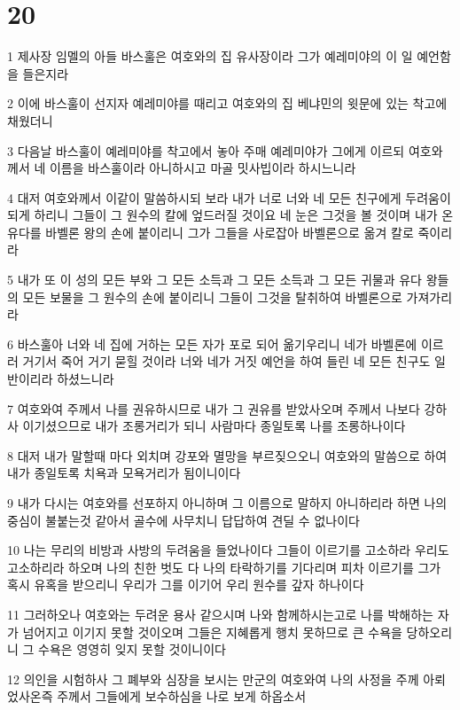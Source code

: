 \chapter{20}

\par 1 제사장 임멜의 아들 바스훌은 여호와의 집 유사장이라 그가 예레미야의 이 일 예언함을 들은지라
\par 2 이에 바스훌이 선지자 예레미야를 때리고 여호와의 집 베냐민의 윗문에 있는 착고에 채웠더니
\par 3 다음날 바스훌이 예레미야를 착고에서 놓아 주매 예레미야가 그에게 이르되 여호와께서 네 이름을 바스훌이라 아니하시고 마골 밋사빕이라 하시느니라
\par 4 대저 여호와께서 이같이 말씀하시되 보라 내가 너로 너와 네 모든 친구에게 두려움이 되게 하리니 그들이 그 원수의 칼에 엎드러질 것이요 네 눈은 그것을 볼 것이며 내가 온 유다를 바벨론 왕의 손에 붙이리니 그가 그들을 사로잡아 바벨론으로 옮겨 칼로 죽이리라
\par 5 내가 또 이 성의 모든 부와 그 모든 소득과 그 모든 소득과 그 모든 귀물과 유다 왕들의 모든 보물을 그 원수의 손에 붙이리니 그들이 그것을 탈취하여 바벨론으로 가져가리라
\par 6 바스훌아 너와 네 집에 거하는 모든 자가 포로 되어 옮기우리니 네가 바벨론에 이르러 거기서 죽어 거기 묻힐 것이라 너와 네가 거짓 예언을 하여 들린 네 모든 친구도 일반이리라 하셨느니라
\par 7 여호와여 주께서 나를 권유하시므로 내가 그 권유를 받았사오며 주께서 나보다 강하사 이기셨으므로 내가 조롱거리가 되니 사람마다 종일토록 나를 조롱하나이다
\par 8 대저 내가 말할때 마다 외치며 강포와 멸망을 부르짖으오니 여호와의 말씀으로 하여 내가 종일토록 치욕과 모욕거리가 됨이니이다
\par 9 내가 다시는 여호와를 선포하지 아니하며 그 이름으로 말하지 아니하리라 하면 나의 중심이 불붙는것 같아서 골수에 사무치니 답답하여 견딜 수 없나이다
\par 10 나는 무리의 비방과 사방의 두려움을 들었나이다 그들이 이르기를 고소하라 우리도 고소하리라 하오며 나의 친한 벗도 다 나의 타락하기를 기다리며 피차 이르기를 그가 혹시 유혹을 받으리니 우리가 그를 이기어 우리 원수를 갚자 하나이다
\par 11 그러하오나 여호와는 두려운 용사 같으시며 나와 함께하시는고로 나를 박해하는 자가 넘어지고 이기지 못할 것이오며 그들은 지혜롭게 행치 못하므로 큰 수욕을 당하오리니 그 수욕은 영영히 잊지 못할 것이니이다
\par 12 의인을 시험하사 그 폐부와 심장을 보시는 만군의 여호와여 나의 사정을 주께 아뢰었사온즉 주께서 그들에게 보수하심을 나로 보게 하옵소서
